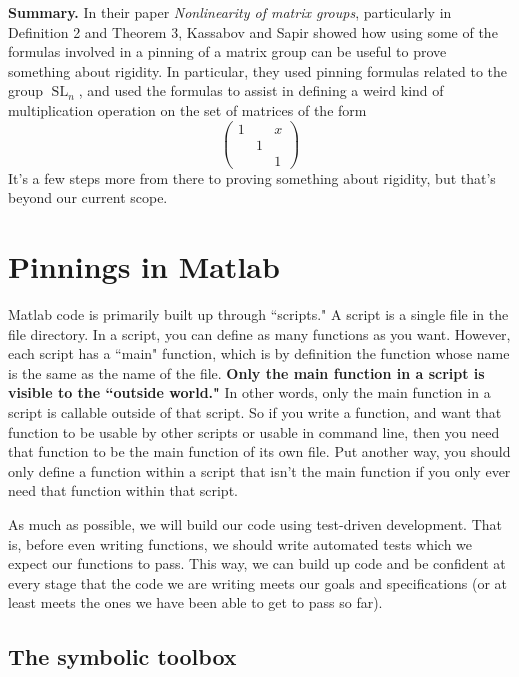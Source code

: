 \documentclass[12pt]{article}
\theoremstyle{definition}
\numberwithin{theorem}{subsection}
\newcommand{\tbf}{\textbf}
\newcommand{\noi}{\noindent}
\DeclareMathOperator{\SL}{SL}
\begin{document}
\bigskip

\noi \tbf{Summary.} In their paper \textit{Nonlinearity of matrix groups}, particularly in Definition 2 and Theorem 3, Kassabov and Sapir showed how using some of the formulas involved in a pinning of a matrix group can be useful to prove something about rigidity. In particular, they used pinning formulas related to the group $\SL_n$, and used the formulas to assist in defining a weird kind of multiplication operation on the set of matrices of the form
\[
	\begin{pmatrix}
		1 && x \\
		& 1 \\
		&& 1
	\end{pmatrix}
\]
It's a few steps more from there to proving something about rigidity, but that's beyond our current scope.

\newpage
\section{Pinnings in Matlab}

Matlab code is primarily built up through ``scripts." A script is a single file in the file directory. In a script, you can define as many functions as you want. However, each script has a ``main" function, which is by definition the function whose name is the same as the name of the file. \tbf{Only the main function in a script is visible to the ``outside world."} In other words, only the main function in a script is callable outside of that script. So if you write a function, and want that function to be usable by other scripts or usable in command line, then you need that function to be the main function of its own file. Put another way, you should only define a function within a script that isn't the main function if you only ever need that function within that script.

As much as possible, we will build our code using test-driven development. That is, before even writing functions, we should write automated tests which we expect our functions to pass. This way, we can build up code and be confident at every stage that the code we are writing meets our goals and specifications (or at least meets the ones we have been able to get to pass so far).

\subsection{The symbolic toolbox}
\end{document}
